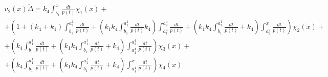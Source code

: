 \documentclass[a4paper,12pt]{article} %
\begin{document}
\begin{multline}
	{v_2(x)}{\tilde{\Delta}}=
	k_4 \int_{b_1}^{x}\frac{dt}{p(t)} \chi_1(x)
	+\\+
	\left( 1+\left( k_4+k_1\right)  \int_{b_1}^{a_1^1}\frac{dt}{p(t)}+\left( k_1 k_4 \int_{b_1}^{a_1^1}\frac{dt}{p(t)}
	k_4\right)  \int_{a_1^4}^{a_2^4}\frac{dt}{p(t)}+\left( k_1 k_4 \int_{b_1}^{a_1^1}\frac{dt}{p(t)}+k_4\right)  \int_{a_2^2}^{x}\frac{dt}{p(t)}\right)  \chi_2(x)
	+\\+
	\left( k_4 \int_{b_1}^{a_1^1}\frac{dt}{p(t)}+\left( k_1 k_4 \int_{b_1}^{a_1^1}\frac{dt}{p(t)}+k_4\right)  \int_{a_1^4}^{a_2^4}\frac{dt}{p(t)}\right)  \chi_3(x)
	+\\+
	\left( k_4 \int_{b_1}^{a_1^1}\frac{dt}{p(t)}+\left( k_1 k_4 \int_{b_1}^{a_1^1}\frac{dt}{p(t)}+k_4\right)  \int_{a_1^4}^{x}\frac{dt}{p(t)}\right)  \chi_4(x)
\end{multline}
\end{document}
